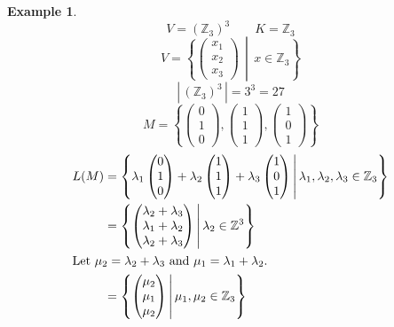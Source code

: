 \documentclass[a4paper,landscape,twocolumn]{article}
\newcommand\set[1]{\left\{#1\right\}}
\newcommand\setdef[2]{\left\{#1\,\middle|\,#2\right\}}
\newcommand\card[1]{\left|\,#1\,\right|}
\newtheorem{ex}{Example}[section]
\begin{document}
\begin{ex}
  \[ V = (\mathbb Z_3)^3 \qquad K = \mathbb Z_3 \]
  \[ V = \setdef{\begin{pmatrix} x_1 \\ x_2 \\ x_3 \end{pmatrix}}{x \in \mathbb Z_3} \]
  \[ \card{(\mathbb Z_3)^3} = 3^3 = 27 \]
  \[ M = \set{\begin{pmatrix} 0 \\ 1 \\ 0 \end{pmatrix}, \begin{pmatrix} 1 \\ 1 \\ 1 \end{pmatrix}, \begin{pmatrix} 1 \\ 0 \\ 1 \end{pmatrix}} \]
  \begin{align*}
    L(M) &= \setdef{%
      \lambda_1 \begin{pmatrix} 0 \\ 1 \\ 0 \end{pmatrix}
      + \lambda_2 \begin{pmatrix} 1 \\ 1 \\ 1 \end{pmatrix}
      + \lambda_3 \begin{pmatrix} 1 \\ 0 \\ 1 \end{pmatrix}%
    }{\lambda_1, \lambda_2, \lambda_3 \in \mathbb Z_3} \\
    &= \setdef{%
      \begin{pmatrix} \lambda_2 + \lambda_3 \\ \lambda_1 + \lambda_2 \\ \lambda_2 + \lambda_3 \end{pmatrix}
    }{\lambda_2 \in \mathbb Z^3} \\
  \intertext{Let $\mu_2 = \lambda_2 + \lambda_3$ and $\mu_1 = \lambda_1 + \lambda_2$.}
    &= \setdef{\begin{pmatrix}\mu_2 \\ \mu_1 \\ \mu_2 \end{pmatrix}}{\mu_1, \mu_2 \in \mathbb Z_3} \\

\end{align*}
\end{ex}
\end{document}
